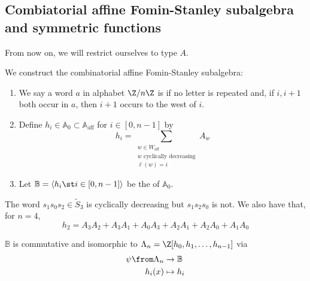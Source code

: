 \documentclass[11pt,leqno,oneside]{amsart}
\numberwithin{thm}{section}
\renewcommand{\W}{W}
\newcommand{\Waff}{\W_{\text{aff}}}
\newcommand{\A}{\mathbb{A}}
\newcommand{\Aaff}{\A_{\text{aff}}}
\newcommand{\B}{\mathbb{B}}
\newcommand{\eS}{\tilde{S}}
\newcommand{\sym}{\Lambda}
\begin{document}
\subsection{Combiatorial affine Fomin-Stanley subalgebra and symmetric
  functions}
From now on, we will restrict ourselves to type \(A\).
\begin{defn}
  We construct the combinatorial affine Fomin-Stanley subalgebra:
  \begin{enumerate}
  \item We say a word \(a\) in alphabet \(\Z/n\Z\) is  if no letter is repeated and, if \(i,i+1\) both
    occur in \(a\), then \(i+1\) occurs to the west of \(i\). 
  \item Define \(h_i \in \A_0 \subset \Aaff\) for \(i \in [0,n-1]\) by
    \[
      h_i = \sum_{\substack{w \in \Waff \\ w \text{ cyclically decreasing} \\ \ell(w) = i}} A_w
    \]
  \item Let \(\B = \langle h_i \st i \in [0,n-1] \rangle\) be the
     of \(\A_0\).
  \end{enumerate}
\end{defn}
\begin{example}
  The word \(s_1s_0s_2 \in \eS_3\) is cyclically decreasing but \(s_1
  s_2 s_0\) is not. We also have that, for \(n=4\), \[
    h_2 = A_3 A_2 + A_3 A_1 + A_0 A_3 + A_2 A_1 + A_2 A_0 + A_1 A_0
  \]
\end{example}
\begin{prop}
  \(\B\) is commutative and isomorphic to \(\sym_n =
  \Z[h_0,h_1,\ldots,h_{n-1}]\) via
  \begin{align*}
    \psi \from \sym_n & \to \B \\
    h_i(x) & \mapsto h_i
  \end{align*}
\end{prop}
\end{document}
